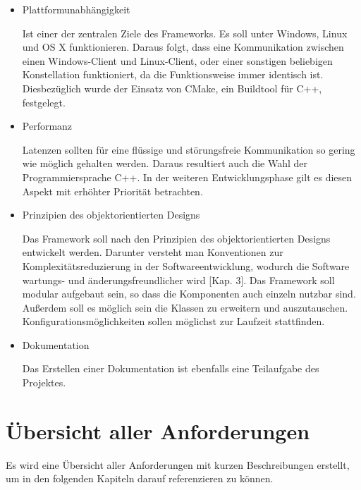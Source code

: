 \begin{itemize} 
\item Plattformunabhängigkeit

Ist einer der zentralen Ziele des Frameworks. Es soll unter Windows, Linux und OS X funktionieren. Daraus folgt, dass eine Kommunikation zwischen einen Windows-Client und Linux-Client, oder einer sonstigen beliebigen Konstellation funktioniert, da die Funktionsweise immer identisch ist. Diesbezüglich wurde der Einsatz von CMake, ein Buildtool für C++, festgelegt.
		
\item Performanz

Latenzen sollten für eine flüssige und störungsfreie Kommunikation so gering wie möglich gehalten werden. Daraus resultiert auch die Wahl der Programmiersprache C++. In der weiteren Entwicklungsphase gilt es diesen Aspekt mit erhöhter Priorität betrachten.
		
\item Prinzipien des objektorientierten Designs

Das Framework soll nach den Prinzipien des objektorientierten Designs entwickelt werden. Darunter versteht man Konventionen zur Komplexitätsreduzierung in der Softwareentwicklung, wodurch die Software wartungs- und änderungsfreundlicher wird \cite{Lahres2009}[Kap. 3]. Das Framework soll modular aufgebaut sein, so dass die Komponenten auch einzeln nutzbar sind. Außerdem soll es möglich sein die Klassen zu erweitern und auszutauschen. Konfigurationsmöglichkeiten sollen möglichst zur Laufzeit stattfinden. 
		
\item Dokumentation

Das Erstellen einer Dokumentation ist ebenfalls eine Teilaufgabe des Projektes.
		
\end{itemize}

\newpage
\section{Übersicht aller Anforderungen}
Es wird eine Übersicht aller Anforderungen mit kurzen Beschreibungen erstellt, um in den folgenden Kapiteln darauf referenzieren zu können.

